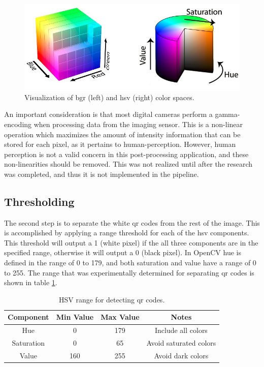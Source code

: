\begin{figure}
	\centering
    \includegraphics[width=5.5in]{figures/bgr_and_hsv.jpg}
    \caption[BGR and HSV color spaces]{Visualization of \ac{bgr} (left) and \ac{hsv} (right) color spaces.}
    \label{figure:color_spaces}
\end{figure} 

An important consideration is that most digital cameras perform a gamma-encoding when processing data from the imaging sensor.  This is a non-linear operation which maximizes the amount of intensity information that can be stored for each pixel, as it pertains to human-perception.  However, human perception is not a valid concern in this post-processing application, and these non-linearities should be removed.  This was not realized until after the research was completed, and thus it is not implemented in the pipeline.

\subsection{Thresholding}
\label{section:qr_thresholding}

The second step is to separate the white \ac{qr} codes from the rest of the image.  This is accomplished by applying a range threshold for each of the \ac{hsv} components.  This threshold will output a 1 (white pixel) if the all three components are in the specified range, otherwise it will output a 0 (black pixel).  In OpenCV hue is defined in the range of 0 to 179, and both saturation and value have a range of 0 to 255.  The range that was experimentally determined for separating \ac{qr} codes is shown in table \ref{table:qr_hsv_ranges}.

\begin{table}
    \begin{center}
    \caption[QR code detection values]{HSV range for detecting \ac{qr} codes.}
    \begin{tabular}[c]{|c|c|c|c|}
        \hline
        Component & Min Value & Max Value & Notes \\
        \hline
        Hue        & 0   & 179 & Include all colors      \\
        Saturation & 0   & 65  & Avoid saturated colors  \\
        Value      & 160 & 255 & Avoid dark colors       \\
        \hline
    \end{tabular}
    \label{table:qr_hsv_ranges}
   \end{center}
\end{table}

